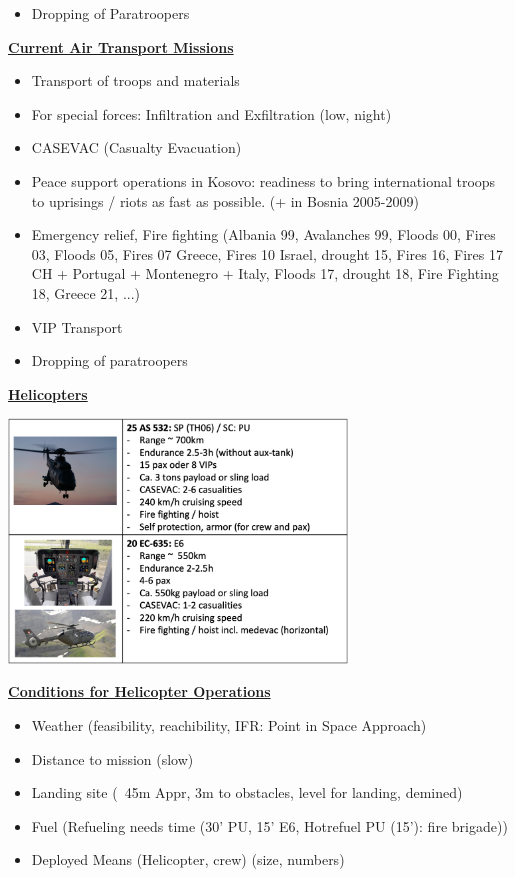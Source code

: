 \documentclass[9pt, landscape, fleqn]{scrartcl}
\begin{document}
\begin{multicols*}{3}
\begin{itemize}
    \item Dropping of Paratroopers
\end{itemize}
\underline{\textbf{Current Air Transport Missions}}
\begin{itemize}
    \item Transport of troops and materials
    \item For special forces: Infiltration and Exfiltration (low, night)
    \item CASEVAC (Casualty Evacuation)
    \item Peace support operations in Kosovo: readiness to bring international troops to uprisings / riots as fast as possible.
    (+ in Bosnia 2005-2009)
    \item Emergency relief, Fire fighting
    (Albania 99, Avalanches 99, Floods 00, Fires 03, Floods 05, Fires 07 Greece, Fires 10 Israel, drought 15, Fires 16, Fires 17 CH + Portugal + Montenegro + Italy, Floods 17, drought 18, Fire Fighting 18, Greece 21, ...)
    \item VIP Transport
    \item Dropping of paratroopers
\end{itemize}
\underline{\textbf{Helicopters}}
\begin{center}
    \includegraphics[width=9cm]{Images/Helicopters.png}
\end{center}
\underline{\textbf{Conditions for Helicopter Operations}}
\begin{itemize}
    \item Weather (feasibility, reachibility, IFR: Point in Space Approach)
    \item Distance to mission (slow)
    \item Landing site (~45m Appr, 3m to obstacles, level for landing, demined)
    \item Fuel (Refueling needs time (30' PU, 15' E6, Hotrefuel PU (15'): fire brigade))
    \item Deployed Means (Helicopter, crew) (size, numbers)

\end{itemize}
\end{multicols*}
\end{document}
